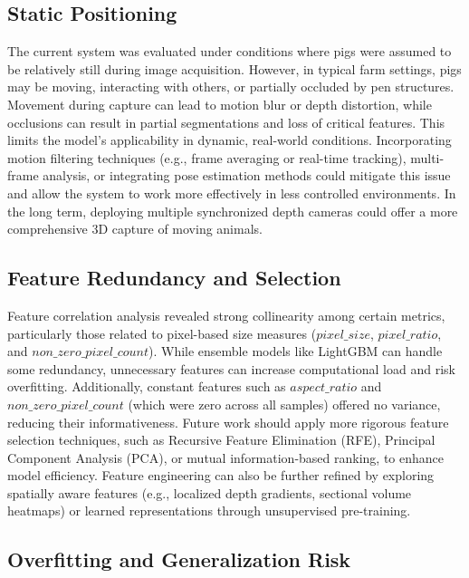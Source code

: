 \subsection{Static Positioning}

The current system was evaluated under conditions where pigs were assumed to be relatively still during image acquisition. However, in typical farm settings, pigs may be moving, interacting with others, or partially occluded by pen structures. Movement during capture can lead to motion blur or depth distortion, while occlusions can result in partial segmentations and loss of critical features. This limits the model’s applicability in dynamic, real-world conditions. Incorporating motion filtering techniques (e.g., frame averaging or real-time tracking), multi-frame analysis, or integrating pose estimation methods could mitigate this issue and allow the system to work more effectively in less controlled environments. In the long term, deploying multiple synchronized depth cameras could offer a more comprehensive 3D capture of moving animals.

\subsection{Feature Redundancy and Selection}

Feature correlation analysis revealed strong collinearity among certain metrics, particularly those related to pixel-based size measures ($pixel\_size$, $pixel\_ratio$, and $non\_zero\_pixel\_count$). While ensemble models like LightGBM can handle some redundancy, unnecessary features can increase computational load and risk overfitting. Additionally, constant features such as $aspect\_ratio$ and $non\_zero\_pixel\_count$ (which were zero across all samples) offered no variance, reducing their informativeness. Future work should apply more rigorous feature selection techniques, such as Recursive Feature Elimination (RFE), Principal Component Analysis (PCA), or mutual information-based ranking, to enhance model efficiency. Feature engineering can also be further refined by exploring spatially aware features (e.g., localized depth gradients, sectional volume heatmaps) or learned representations through unsupervised pre-training.

\subsection{Overfitting and Generalization Risk}

